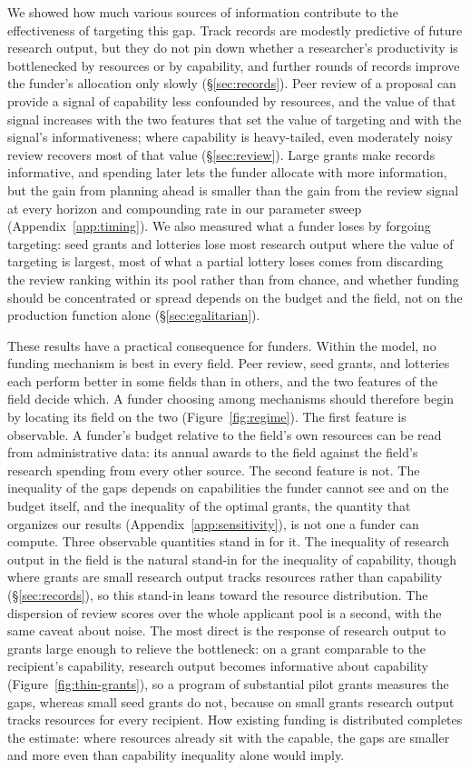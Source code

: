 \documentclass[article, 11pt, reqno]{amsart}
\theoremstyle{named}
\begin{document}
We showed how much various sources of information contribute to the effectiveness of targeting this gap. Track records are modestly predictive of future research output, but they do not pin down whether a researcher's productivity is bottlenecked by resources or by capability, and further rounds of records improve the funder's allocation only slowly (\S\ref{sec:records}). Peer review of a proposal can provide a signal of capability less confounded by resources, and the value of that signal increases with the two features that set the value of targeting and with the signal's informativeness; where capability is heavy-tailed, even moderately noisy review recovers most of that value (\S\ref{sec:review}). Large grants make records informative, and spending later lets the funder allocate with more information, but the gain from planning ahead is smaller than the gain from the review signal at every horizon and compounding rate in our parameter sweep (Appendix~\ref{app:timing}). We also measured what a funder loses by forgoing targeting: seed grants and lotteries lose most research output where the value of targeting is largest, most of what a partial lottery loses comes from discarding the review ranking within its pool rather than from chance, and whether funding should be concentrated or spread depends on the budget and the field, not on the production function alone (\S\ref{sec:egalitarian}).

These results have a practical consequence for funders. Within the model, no funding mechanism is best in every field. Peer review, seed grants, and lotteries each perform better in some fields than in others, and the two features of the field decide which. A funder choosing among mechanisms should therefore begin by locating its field on the two (Figure~\ref{fig:regime}). The first feature is observable. A funder's budget relative to the field's own resources can be read from administrative data: its annual awards to the field against the field's research spending from every other source. The second feature is not. The inequality of the gaps depends on capabilities the funder cannot see and on the budget itself, and the inequality of the optimal grants, the quantity that organizes our results (Appendix~\ref{app:sensitivity}), is not one a funder can compute. Three observable quantities stand in for it. The inequality of research output in the field is the natural stand-in for the inequality of capability, though where grants are small research output tracks resources rather than capability (\S\ref{sec:records}), so this stand-in leans toward the resource distribution. The dispersion of review scores over the whole applicant pool is a second, with the same caveat about noise. The most direct is the response of research output to grants large enough to relieve the bottleneck: on a grant comparable to the recipient's capability, research output becomes informative about capability (Figure~\ref{fig:thin-grants}), so a program of substantial pilot grants measures the gaps, whereas small seed grants do not, because on small grants research output tracks resources for every recipient. How existing funding is distributed completes the estimate: where resources already sit with the capable, the gaps are smaller and more even than capability inequality alone would imply.
\end{document}
